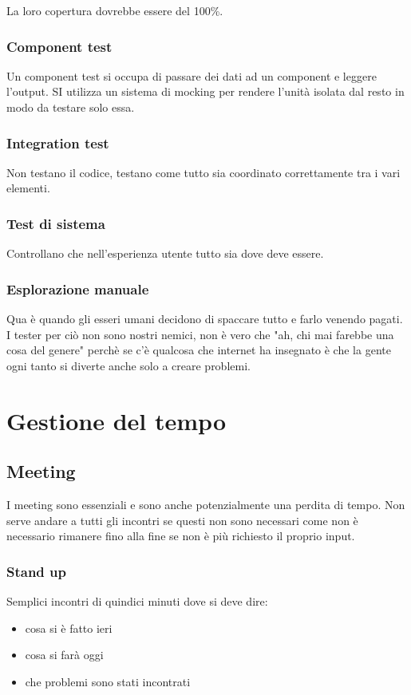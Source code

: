 \documentclass[11pt,a4paper]{book}
\begin{document}
La loro copertura dovrebbe essere del 100\%.

\subsection{Component test}
Un component test si occupa di passare dei dati ad un component e leggere l'output. SI utilizza un sistema di mocking per rendere l'unità isolata dal resto in modo da testare solo essa.

\subsection{Integration test}
Non testano il codice, testano come tutto sia coordinato correttamente tra i vari elementi.

\subsection{Test di sistema}
Controllano che nell'esperienza utente tutto sia dove deve essere.

\subsection{Esplorazione manuale}
Qua è quando gli esseri umani decidono di spaccare tutto e farlo venendo pagati. I tester per ciò non sono nostri nemici, non è vero che "ah, chi mai farebbe una cosa del genere" perchè se c'è qualcosa che internet ha insegnato è che la gente ogni tanto si diverte anche solo a creare problemi.

\chapter{Gestione del tempo}
\section{Meeting}
I meeting sono essenziali e sono anche potenzialmente una perdita di tempo. Non serve andare a tutti gli incontri se questi non sono necessari come non è necessario rimanere fino alla fine se non è più richiesto il proprio input.

\subsection{Stand up}
Semplici incontri di quindici minuti dove si deve dire:
\begin{itemize}
	\item cosa si è fatto ieri
	\item cosa si farà oggi
	\item che problemi sono stati incontrati
\end{itemize}
\end{document}
